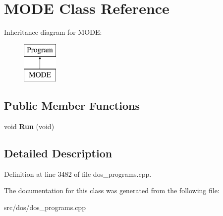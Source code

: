 \hypertarget{classMODE}{\section{M\-O\-D\-E Class Reference}
\label{classMODE}
}
Inheritance diagram for M\-O\-D\-E\-:\begin{figure}[H]
\begin{center}
\leavevmode
\includegraphics[height=2.000000cm]{classMODE}
\end{center}
\end{figure}
\subsection*{Public Member Functions}
\begin{DoxyCompactItemize}
\item 
\hypertarget{classMODE_ae1eafc4abaabb5f647bff778f0e78215}{void {\bfseries Run} (void)}\label{classMODE_ae1eafc4abaabb5f647bff778f0e78215}

\end{DoxyCompactItemize}


\subsection{Detailed Description}


Definition at line 3482 of file dos\-\_\-programs.\-cpp.



The documentation for this class was generated from the following file\-:\begin{DoxyCompactItemize}
\item 
src/dos/dos\-\_\-programs.\-cpp\end{DoxyCompactItemize}
